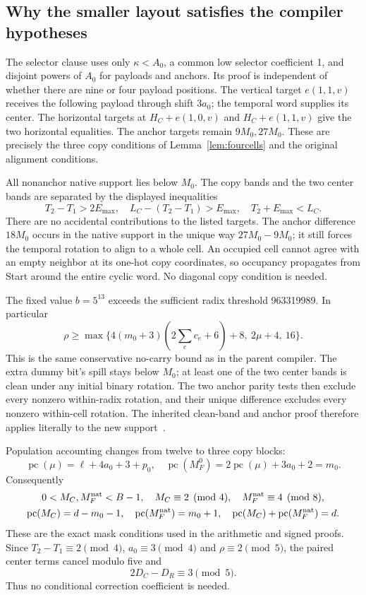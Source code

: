 \documentclass[11pt,a4paper]{article}
\theoremstyle{remark}\newtheorem{remark}[theorem]{Remark}
\newcommand{\pc}{\operatorname{pc}}
\newcommand{\Mnat}{M_F^{\mathrm{nat}}}
\begin{document}
\subsection{Why the smaller layout satisfies the compiler hypotheses}
The selector clause uses only \(\kappa<A_0\), a common low selector
coefficient 1, and disjoint powers of \(A_0\) for payloads and anchors.
Its proof is independent of whether there are nine or four payload
positions. The vertical target \(e(1,1,v)\) receives the following
payload through shift \(3a_0\); the temporal word supplies its center.
The horizontal targets at \(H_C+e(1,0,v)\) and \(H_C+e(1,1,v)\)
give the two horizontal equalities. The anchor targets remain
\(9M_0,27M_0\). These are precisely the three copy conditions of
Lemma~\ref{lem:fourcells} and the original alignment conditions.

All nonanchor native support lies below \(M_0\). The copy bands and
the two center bands are separated by the displayed inequalities
\[
 T_2-T_1>2E_{\max},\quad
 L_C-(T_2-T_1)>E_{\max},\quad T_2+E_{\max}<L_C.
\]
There are no accidental contributions to the listed targets. The anchor
difference \(18M_0\) occurs in the native support in the unique way
\(27M_0-9M_0\); it still forces the temporal rotation to align to a
whole cell. An occupied cell cannot agree with an empty neighbor at its
one-hot copy coordinates, so occupancy propagates from Start around the
entire cyclic word. No diagonal copy condition is needed.

The fixed value \(b=5^{13}\) exceeds the sufficient radix threshold
963319989. In particular
\[
 \rho\ge\max\{4(m_0+3)(2\sum_e c_e+6)+8,\ 2\mu+4,\ 16\}.
\]
This is the same conservative no-carry bound as in the parent compiler.
The extra dummy bit's spill stays below \(M_0\); at least one of the
two center bands is clean under any initial binary rotation. The two
anchor parity tests then exclude every nonzero within-radix rotation,
and their unique difference excludes every nonzero within-cell rotation.
The inherited clean-band and anchor proof therefore applies literally
to the new support~\cite{blank,compiler}.

Population accounting changes from twelve to three copy blocks:
\[
 \pc(\mu)=\ell+4a_0+3+p_0,\quad
 \pc(M_F^0)=2\pc(\mu)+3a_0+2=m_0.
\]
Consequently
\begin{gather}
 0<M_C,\Mnat<B-1,\quad M_C\equiv2\pmod4,
 \quad\Mnat\equiv4\pmod8,\notag\\
 \pc(M_C)=d-m_0-1,
 \quad\pc(\Mnat)=m_0+1,
 \quad\pc(M_C)+\pc(\Mnat)=d.
\end{gather}
These are the exact mask conditions used in the arithmetic and signed
proofs. Since \(T_2-T_1\equiv2\pmod4\), \(a_0\equiv3\pmod4\)
and \(\rho\equiv2\pmod5\), the paired center terms cancel modulo
five and
\begin{equation}
 2D_C-D_R\equiv3\pmod5.\label{eq:fiveunit}
\end{equation}
Thus no conditional correction coefficient is needed.
\end{document}
